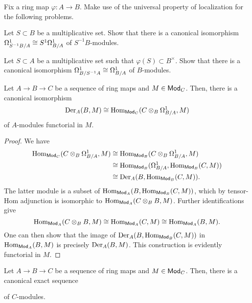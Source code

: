 \documentclass[11pt]{article}
\renewcommand{\phi}{\varphi}
\begin{document}
\begin{exercise}
Fix a ring map $\phi: A\to B$. Make use of the universal property of localization for the following problems.
\begin{enum}{\alph}
\item Let $S\subset B$ be a multiplicative set. Show that there is a canonical isomorphism $\Omega_{S^{-1}B/A}^1\cong S^1\Omega_{B/A}^1$ of $S^{-1}B$-modules.

\item Let $S\subset A$ be a multiplicative set such that $\phi(S)\subset B^{\times}$. Show that there is a canonical isomorphism $\Omega_{B/S^{-1}A}^1\cong\Omega_{B/A}^1$ of $B$-modules.
\end{enum}
\end{exercise}

\begin{proposition}
Let $A\to B\to C$ be a sequence of ring maps and $M\in\operatorname{\mathsf{Mod}}_C$. Then, there is a canonical isomorphism 
$$\operatorname{Der}_A(B,M)\cong\operatorname{Hom}_{\operatorname{\mathsf{Mod}}_C}(C\otimes_B\Omega_{B/A}^1,M)$$
of $A$-modules functorial in $M$.
\end{proposition}

\begin{proof}
We have
\begin{align*}
\operatorname{Hom}_{\operatorname{\mathsf{Mod}}_C}(C\otimes_B\Omega_{B/A}^1,M)
&\cong\operatorname{Hom}_{\operatorname{\mathsf{Mod}}_B}(C\otimes_B\Omega_{B/A}^1,M) \\
&\cong\operatorname{Hom}_{\operatorname{\mathsf{Mod}}_B}(\Omega_{B/A}^1,\operatorname{Hom}_{\operatorname{\mathsf{Mod}}_B}(C,M)) \\
&\cong\operatorname{Der}_A(B,\operatorname{Hom}_{\operatorname{\mathsf{Mod}}_B}(C,M)).
\end{align*}
The latter module is a subset of $\operatorname{Hom}_{\operatorname{\mathsf{Mod}}_A}(B,\operatorname{Hom}_{\operatorname{\mathsf{Mod}}_B}(C,M))$, which by tensor-Hom adjunction is isomorphic to $\operatorname{Hom}_{\operatorname{\mathsf{Mod}}_A}(C\otimes_BB,M)$. Further identifications give 
$$\operatorname{Hom}_{\operatorname{\mathsf{Mod}}_A}(C\otimes_BB,M)\cong\operatorname{Hom}_{\operatorname{\mathsf{Mod}}_A}(C,M)\cong\operatorname{Hom}_{\operatorname{\mathsf{Mod}}_A}(B,M).$$
One can then show that the image of $\operatorname{Der}_A(B,\operatorname{Hom}_{\operatorname{\mathsf{Mod}}_B}(C,M))$ in $\operatorname{Hom}_{\operatorname{\mathsf{Mod}}_A}(B,M)$ is precisely $\operatorname{Der}_A(B,M)$. This construction is evidently functorial in $M$.
\end{proof}

\begin{corollary}
Let $A\to B\to C$ be a sequence of ring maps and $M\in\operatorname{\mathsf{Mod}}_C$. Then, there is a canonical exact sequence
\begin{center}
\end{center}
of $C$-modules.
\end{corollary}
\end{document}
